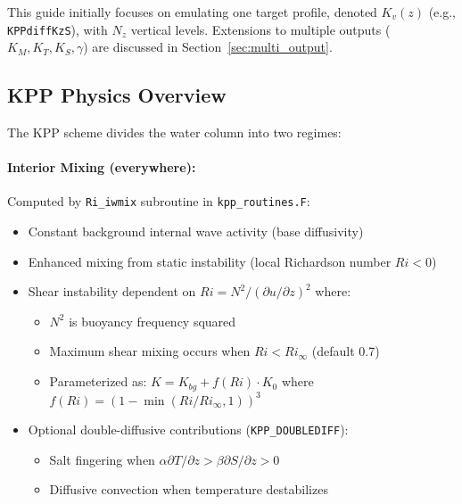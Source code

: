 \documentclass[11pt, a4paper]{article}
\begin{document}
This guide initially focuses on emulating one target profile, denoted $K_v(z)$ (e.g., \texttt{KPPdiffKzS}), with $N_z$ vertical levels. Extensions to multiple outputs ($K_M, K_T, K_S, \gamma$) are discussed in Section~\ref{sec:multi_output}.

\subsection{KPP Physics Overview}

The KPP scheme divides the water column into two regimes:

\paragraph{Interior Mixing (everywhere):} Computed by \texttt{Ri\_iwmix} subroutine in \texttt{kpp\_routines.F}:
\begin{itemize}
    \item Constant background internal wave activity (base diffusivity)
    \item Enhanced mixing from static instability (local Richardson number $Ri < 0$)
    \item Shear instability dependent on $Ri = N^2 / (\partial u/\partial z)^2$ where:
    \begin{itemize}
        \item $N^2$ is buoyancy frequency squared
        \item Maximum shear mixing occurs when $Ri < Ri_\infty$ (default 0.7)
        \item Parameterized as: $K = K_{bg} + f(Ri) \cdot K_0$ where $f(Ri) = (1 - \min(Ri/Ri_\infty, 1))^3$
    \end{itemize}
    \item Optional double-diffusive contributions (\texttt{KPP\_DOUBLEDIFF}):
    \begin{itemize}
        \item Salt fingering when $\alpha \partial T/\partial z > \beta \partial S/\partial z > 0$
        \item Diffusive convection when temperature destabilizes
    \end{itemize}
\end{itemize}
\end{document}

